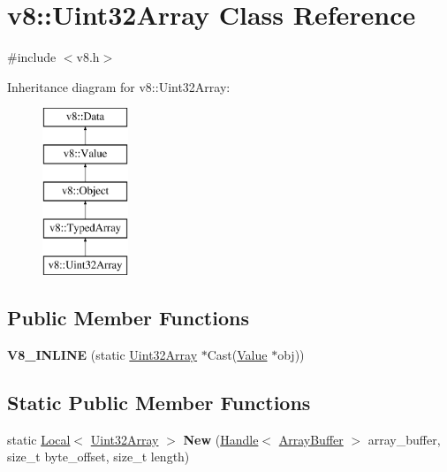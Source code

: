 \hypertarget{classv8_1_1_uint32_array}{}\section{v8\+:\+:Uint32\+Array Class Reference}
\label{classv8_1_1_uint32_array}


{\ttfamily \#include $<$v8.\+h$>$}

Inheritance diagram for v8\+:\+:Uint32\+Array\+:\begin{figure}[H]
\begin{center}
\leavevmode
\includegraphics[height=5.000000cm]{classv8_1_1_uint32_array}
\end{center}
\end{figure}
\subsection*{Public Member Functions}
\begin{DoxyCompactItemize}
\item 
\hypertarget{classv8_1_1_uint32_array_a6d6331a068bd0d5ee818201f232426d7}{}{\bfseries V8\+\_\+\+I\+N\+L\+I\+N\+E} (static \hyperlink{classv8_1_1_uint32_array}{Uint32\+Array} $\ast$Cast(\hyperlink{classv8_1_1_value}{Value} $\ast$obj))\label{classv8_1_1_uint32_array_a6d6331a068bd0d5ee818201f232426d7}

\end{DoxyCompactItemize}
\subsection*{Static Public Member Functions}
\begin{DoxyCompactItemize}
\item 
\hypertarget{classv8_1_1_uint32_array_a38de3d179f9a569a91ee9aef4d9f923f}{}static \hyperlink{classv8_1_1_local}{Local}$<$ \hyperlink{classv8_1_1_uint32_array}{Uint32\+Array} $>$ {\bfseries New} (\hyperlink{classv8_1_1_handle}{Handle}$<$ \hyperlink{classv8_1_1_array_buffer}{Array\+Buffer} $>$ array\+\_\+buffer, size\+\_\+t byte\+\_\+offset, size\+\_\+t length)\label{classv8_1_1_uint32_array_a38de3d179f9a569a91ee9aef4d9f923f}

\end{DoxyCompactItemize}


